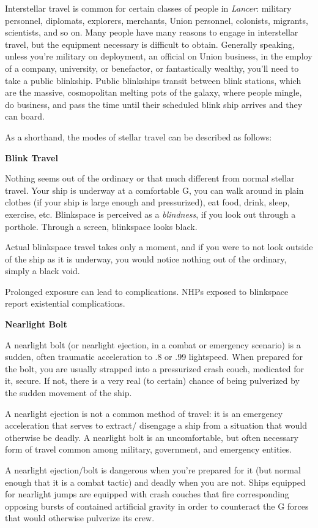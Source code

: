 Interstellar travel is common for certain classes of people in \textit{Lancer}: military personnel,
diplomats, explorers, merchants, Union personnel, colonists, migrants, scientists, and so on.
Many people have many reasons to engage in interstellar travel, but the equipment necessary is
difficult to obtain. Generally speaking, unless you’re military on deployment, an official on Union
business, in the employ of a company, university, or benefactor, or fantastically wealthy, you’ll
need to take a public blinkship. Public blinkships transit between blink stations, which are the
massive, cosmopolitan melting pots of the galaxy, where people mingle, do business, and pass
the time until their scheduled blink ship arrives and they can board.

As a shorthand, the modes of stellar travel can be described as follows:

\textbf{Blink Travel}

Nothing seems out of the ordinary or that much different from normal stellar travel. Your ship is
underway at a comfortable G, you can walk around in plain clothes (if your ship is large enough
and pressurized), eat food, drink, sleep, exercise, etc. Blinkspace is perceived as a \textit{blindness}, if
you look out through a porthole. Through a screen, blinkspace looks black.

Actual blinkspace travel takes only a moment, and if you were to not look outside of the ship as it
is underway, you would notice nothing out of the ordinary, simply a black void.

Prolonged exposure can lead to complications. NHPs exposed to blinkspace report existential
complications.

\textbf{Nearlight Bolt}

A nearlight bolt (or nearlight ejection, in a combat or emergency scenario) is a sudden, often
traumatic acceleration to .8 or .99 lightspeed. When prepared for the bolt, you are usually
strapped into a pressurized crash couch, medicated for it, secure. If not, there is a very real (to
certain) chance of being pulverized by the sudden movement of the ship.

A nearlight ejection is not a common method of travel: it is an emergency acceleration that
serves to extract/ disengage a ship from a situation that would otherwise be deadly. A nearlight
bolt is an uncomfortable, but often necessary form of travel common among military,
government, and emergency entities.

A nearlight ejection/bolt is dangerous when you’re prepared for it (but normal enough that it is a
combat tactic) and deadly when you are not. Ships equipped for nearlight jumps are equipped
with crash couches that fire corresponding opposing bursts of contained artificial gravity in order
to counteract the G forces that would otherwise pulverize its crew.


